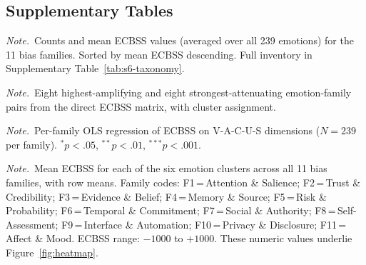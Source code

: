 \documentclass[12pt,a4paper]{article}
\newcommand{\ecbss}{\textsc{ECBSS}}
\newcommand{\vacus}{V-A-C-U-S}
\newcommand{\tabnote}[1]{%
  \par\vspace{3pt}\noindent%
  \begin{minipage}{0.96\linewidth}\footnotesize\raggedright\textit{Note.}~#1\end{minipage}%
}
\begin{document}
\clearpage
\subsection*{Supplementary Tables}

\begin{table}[H]
  \raggedright
  \small
  \caption{Taxonomy summary statistics}
  \label{tab:s1-taxonomy}
  \resizebox{\textwidth}{!}{}
  \tabnote{Counts and mean \ecbss{} values (averaged over all 239 emotions) for the 11 bias families. Sorted by mean \ecbss{} descending. Full inventory in Supplementary Table~\ref{tab:s6-taxonomy}.}
\end{table}

\begin{table}[htb]
  \raggedright
  \small
  \caption{Top amplifying and attenuating emotion-family pairs}
  \label{tab:s2-pairs}
  \renewcommand{\arraystretch}{0.94}
  \resizebox{\textwidth}{!}{}
  \tabnote{Eight highest-amplifying and eight strongest-attenuating emotion-family pairs from the direct \ecbss{} matrix, with cluster assignment.}
\end{table}

\begin{table}[htb]
  \raggedright
  \small
  \caption{Per-family regression coefficients and variance explained}
  \label{tab:s3-regression}
  \resizebox{\textwidth}{!}{}
  \tabnote{Per-family OLS regression of \ecbss{} on \vacus{} dimensions ($N = 239$ per family). ${}^{*}p < .05$, ${}^{**}p < .01$, ${}^{***}p < .001$.}
\end{table}

\begin{table}[htb]
  \raggedright
  \small
  \caption{Cluster-level mean \ecbss{} matrix (all 11 families)}
  \label{tab:s4-cluster}
  \resizebox{\textwidth}{!}{}
  \tabnote{Mean \ecbss{} for each of the six emotion clusters across all 11 bias families, with row means. Family codes: F1\,=\,Attention \& Salience; F2\,=\,Trust \& Credibility; F3\,=\,Evidence \& Belief; F4\,=\,Memory \& Source; F5\,=\,Risk \& Probability; F6\,=\,Temporal \& Commitment; F7\,=\,Social \& Authority; F8\,=\,Self-Assessment; F9\,=\,Interface \& Automation; F10\,=\,Privacy \& Disclosure; F11\,=\,Affect \& Mood. \ecbss{} range: $-1000$ to $+1000$. These numeric values underlie Figure~\ref{fig:heatmap}.}
\end{table}
\end{document}
